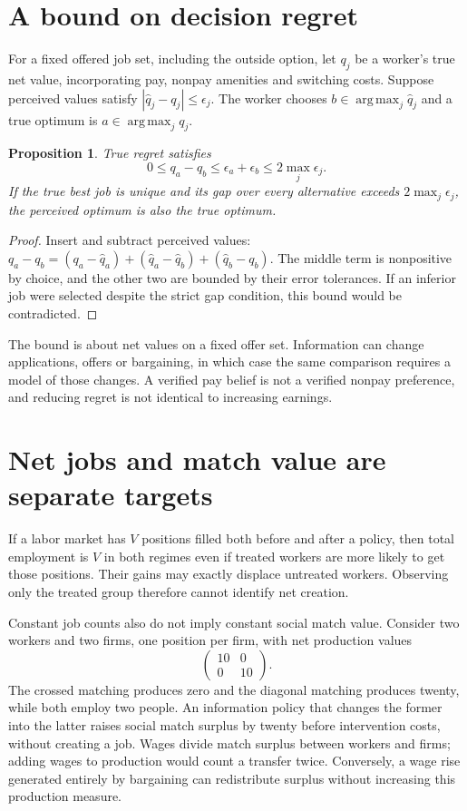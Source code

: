 \documentclass[11pt]{article}
\newtheorem{proposition}{Proposition}
\DeclareMathOperator*{\argmax}{arg\,max}
\begin{document}
\section*{A bound on decision regret}
For a fixed offered job set, including the outside option, let $q_j$ be a worker's true net value, incorporating pay, nonpay amenities and switching costs. Suppose perceived values satisfy $|\widehat q_j-q_j|\leq\epsilon_j$. The worker chooses $b\in\argmax_j\widehat q_j$ and a true optimum is $a\in\argmax_jq_j$.
\begin{proposition}
True regret satisfies
\[
 0\leq q_a-q_b\leq\epsilon_a+\epsilon_b\leq2\max_j\epsilon_j.
\]
If the true best job is unique and its gap over every alternative exceeds $2\max_j\epsilon_j$, the perceived optimum is also the true optimum.
\end{proposition}
\begin{proof}
Insert and subtract perceived values:
$q_a-q_b=(q_a-\widehat q_a)+(\widehat q_a-\widehat q_b)+(\widehat q_b-q_b)$. The middle term is nonpositive by choice, and the other two are bounded by their error tolerances. If an inferior job were selected despite the strict gap condition, this bound would be contradicted.
\end{proof}

The bound is about net values on a fixed offer set. Information can change applications, offers or bargaining, in which case the same comparison requires a model of those changes. A verified pay belief is not a verified nonpay preference, and reducing regret is not identical to increasing earnings.

\section*{Net jobs and match value are separate targets}
If a labor market has $V$ positions filled both before and after a policy, then total employment is $V$ in both regimes even if treated workers are more likely to get those positions. Their gains may exactly displace untreated workers. Observing only the treated group therefore cannot identify net creation.

Constant job counts also do not imply constant social match value. Consider two workers and two firms, one position per firm, with net production values
\[
 \begin{pmatrix}10&0\\0&10\end{pmatrix}.
\]
The crossed matching produces zero and the diagonal matching produces twenty, while both employ two people. An information policy that changes the former into the latter raises social match surplus by twenty before intervention costs, without creating a job. Wages divide match surplus between workers and firms; adding wages to production would count a transfer twice. Conversely, a wage rise generated entirely by bargaining can redistribute surplus without increasing this production measure.
\end{document}
